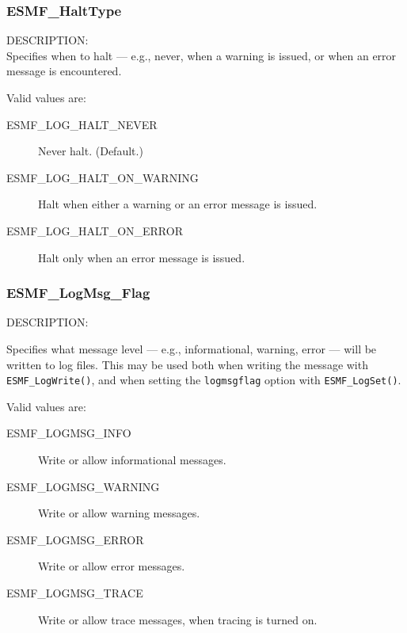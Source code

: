 

\subsubsection{ESMF\_HaltType}

\label{opt:Halttype}
{\sf DESCRIPTION:\\}
Specifies when to halt --- e.g., never, when a warning is issued, or when an
error message is encountered.

Valid values are:
\begin{description}
   \item [ESMF\_LOG\_HALT\_NEVER] 
         Never halt.  (Default.)
   \item [ESMF\_LOG\_HALT\_ON\_WARNING]
         Halt when either a warning or an error message is issued.
   \item [ESMF\_LOG\_HALT\_ON\_ERROR]
         Halt only when an error message is issued.
\end{description}

\subsubsection{ESMF\_LogMsg\_Flag}

\label{opt:logmsgflag}
{\sf DESCRIPTION:\\}
\begin{sloppypar}
Specifies what message level --- e.g., informational, warning, 
error --- will be written to log files.  This may be used both when
writing the message with {\tt ESMF\_LogWrite()}, and when setting the
{\tt logmsgflag} option with {\tt ESMF\_LogSet()}.
\end{sloppypar}

Valid values are:
\begin{description}
   \item [ESMF\_LOGMSG\_INFO] 
         Write or allow informational messages.
   \item [ESMF\_LOGMSG\_WARNING]
         Write or allow warning messages.
   \item [ESMF\_LOGMSG\_ERROR]
         Write or allow error messages.
   \item [ESMF\_LOGMSG\_TRACE]
         Write or allow trace messages, when tracing is turned on.
\end{description}

